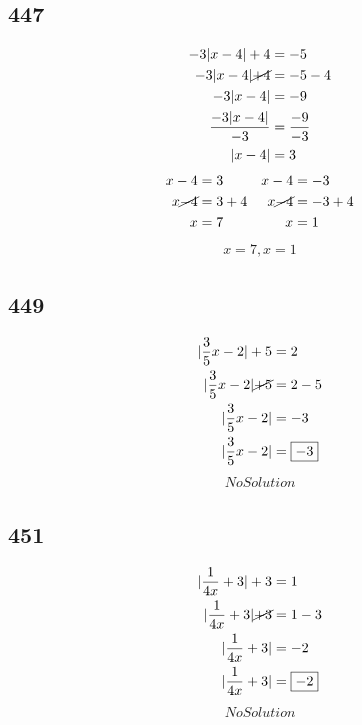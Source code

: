 \documentclass{article}
\begin{document}
    \subsection*{447}
    \begin{align*}
        -3|x -4| +4 &= -5 \\
        -3|x -4| \cancel{+4} &= -5 - 4 \\
        -3|x -4| &= -9 \\
        \frac{-3|x -4|}{-3}  &= \frac{-9}{-3} \\
        |x - 4| &= 3
    \end{align*}
    \begin{align*}
        x - 4 &= 3 &x -4 &= -3\\
        x \cancel{-4} &= 3 + 4 &x \cancel{-4} &= -3 + 4\\
        x  &=  7 &x  &= 1\\
    \end{align*}
    \begin{align*}
        \boxed{x = 7, x = 1}
    \end{align*}


    \subsection*{449}
    \begin{align*}
        |\frac{3}{5}x -2| +5 &= 2 \\
        |\frac{3}{5}x -2| \cancel{+5} &= 2 - 5 \\
        |\frac{3}{5}x -2| &= -3 \\
        |\frac{3}{5}x -2| &= \boxed{-3} \\
    \end{align*}
    \begin{align*}
        \boxed{No Solution}
    \end{align*}

    \subsection*{451}
    \begin{align*}
        |\frac{1}{4x} +3| + 3 &= 1 \\
        |\frac{1}{4x} +3| \cancel{+ 3} &= 1 - 3 \\
        |\frac{1}{4x} +3| &= -2\\
        |\frac{1}{4x} +3| &= \boxed{-2}\\
    \end{align*}
    \begin{align*}
        \boxed{No Solution}
    \end{align*}
\end{document}

